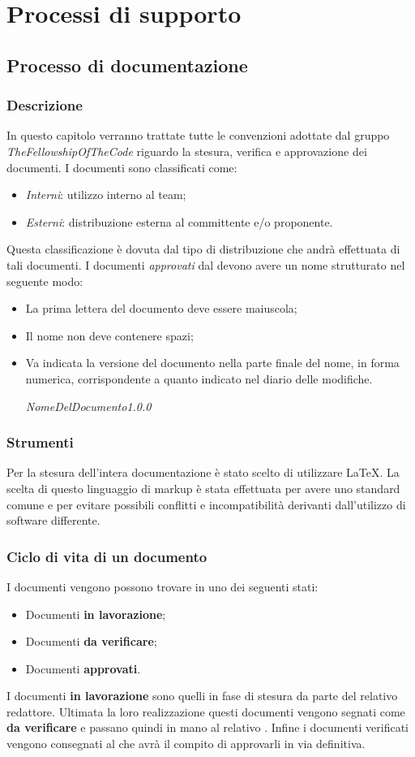 \section{Processi di supporto}
\subsection{Processo di documentazione}
\subsubsection{Descrizione}
In questo capitolo verranno trattate tutte le convenzioni adottate dal gruppo 
\textit{TheFellowshipOfTheCode} riguardo la stesura, verifica e approvazione dei 
documenti.
I documenti sono classificati come:
\begin{itemize}
  \item \textit{Interni}: utilizzo interno al team;
  \item \textit{Esterni}: distribuzione esterna al committente e/o proponente.
\end{itemize}
Questa classificazione è dovuta dal tipo di distribuzione che andrà effettuata di tali documenti.
I documenti \textit{approvati} dal \textit{\RdP} devono avere un nome strutturato nel seguente modo:
\begin{itemize}
  \item La prima lettera del documento deve essere maiuscola;
  \item Il nome non deve contenere spazi;
  \item Va indicata la versione del documento nella parte finale del nome, in forma numerica, 
  corrispondente a quanto indicato nel diario delle modifiche. 
  \begin{center}
  \textit{NomeDelDocumento1.0.0}
  \end{center}
\end{itemize}
\subsubsection{Strumenti}
Per la stesura dell'intera documentazione è stato scelto di utilizzare \LaTeX. 
La scelta di questo linguaggio di markup è stata effettuata per avere uno 
standard comune e per evitare possibili conflitti e incompatibilità derivanti 
dall'utilizzo di software differente.
\subsubsection{Ciclo di vita di un documento}
 I documenti vengono possono trovare in uno dei seguenti stati:
\begin{itemize}
  \item Documenti \textbf{in lavorazione};
  \item Documenti \textbf{da verificare};
  \item Documenti \textbf{approvati}.
\end{itemize}
I documenti \textbf{in lavorazione} sono quelli in fase di stesura da parte del 
relativo redattore. Ultimata la loro realizzazione questi documenti vengono 
segnati come \textbf{da verificare} e passano quindi in mano al relativo 
\textit{\Ver}. Infine i documenti verificati vengono consegnati al \textit{\RdP} 
che avrà il compito di approvarli in via definitiva.
